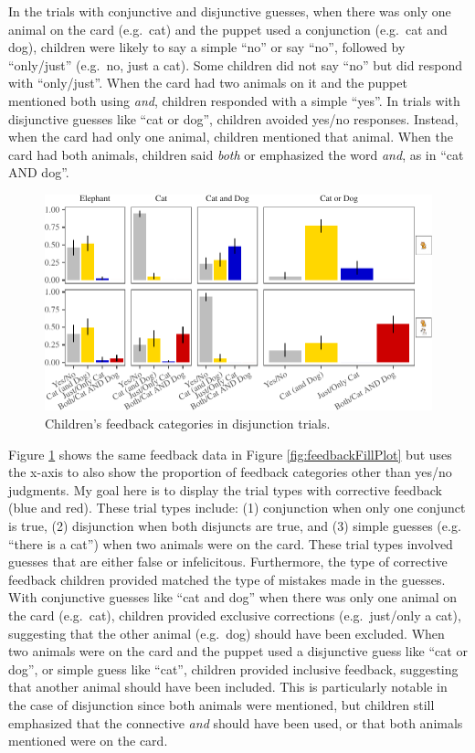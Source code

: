 \documentclass[man]{apa6}
\theoremstyle{definition}
\theoremstyle{definition}
\theoremstyle{definition}
\theoremstyle{remark}
\begin{document}
In the trials with conjunctive and disjunctive guesses, when there was
only one animal on the card (e.g.~cat) and the puppet used a conjunction
(e.g.~cat and dog), children were likely to say a simple \enquote{no} or
say \enquote{no}, followed by \enquote{only/just} (e.g.~no, just a cat).
Some children did not say \enquote{no} but did respond with
\enquote{only/just}. When the card had two animals on it and the puppet
mentioned both using \emph{and}, children responded with a simple
\enquote{yes}. In trials with disjunctive guesses like \enquote{cat or
dog}, children avoided yes/no responses. Instead, when the card had only
one animal, children mentioned that animal. When the card had both
animals, children said \emph{both} or emphasized the word \emph{and}, as
in \enquote{cat AND dog}.

\begin{figure}[t]

{\centering \includegraphics{figs/correctivePlot-1} 

}

\caption{Children's feedback categories in disjunction trials.}\label{fig:correctivePlot}
\end{figure}

Figure \ref{fig:correctivePlot} shows the same feedback data in Figure
\ref{fig:feedbackFillPlot} but uses the x-axis to also show the
proportion of feedback categories other than yes/no judgments. My goal
here is to display the trial types with corrective feedback (blue and
red). These trial types include: (1) conjunction when only one conjunct
is true, (2) disjunction when both disjuncts are true, and (3) simple
guesses (e.g. \enquote{there is a cat}) when two animals were on the
card. These trial types involved guesses that are either false or
infelicitous. Furthermore, the type of corrective feedback children
provided matched the type of mistakes made in the guesses. With
conjunctive guesses like \enquote{cat and dog} when there was only one
animal on the card (e.g.~cat), children provided exclusive corrections
(e.g.~just/only a cat), suggesting that the other animal (e.g.~dog)
should have been excluded. When two animals were on the card and the
puppet used a disjunctive guess like \enquote{cat or dog}, or simple
guess like \enquote{cat}, children provided inclusive feedback,
suggesting that another animal should have been included. This is
particularly notable in the case of disjunction since both animals were
mentioned, but children still emphasized that the connective \emph{and}
should have been used, or that both animals mentioned were on the card.
\end{document}
